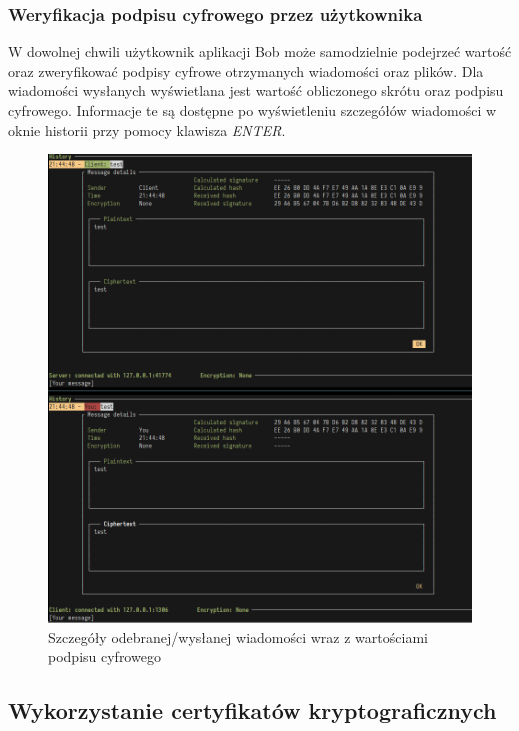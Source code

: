 \documentclass{article}
\begin{document}
      \subsubsection{Weryfikacja podpisu cyfrowego przez użytkownika}
        W dowolnej chwili użytkownik aplikacji Bob może samodzielnie podejrzeć wartość oraz zweryfikować podpisy cyfrowe
        otrzymanych wiadomości oraz plików. Dla wiadomości wysłanych wyświetlana jest wartość obliczonego skrótu oraz
        podpisu cyfrowego. Informacje te są dostępne po wyświetleniu szczegółów wiadomości w oknie historii przy pomocy
        klawisza \emph{ENTER}.

        \begin{figure}[H]
            \centering
            \includegraphics[scale=0.45]{szczegoly_wiadomosci_z_podpisem}
            \caption{Szczegóły odebranej/wysłanej wiadomości wraz z wartościami podpisu cyfrowego}
            \label{DIGITAL_SIGNATURE}
        \end{figure}

  \subsection{Wykorzystanie certyfikatów kryptograficznych}
\end{document}
